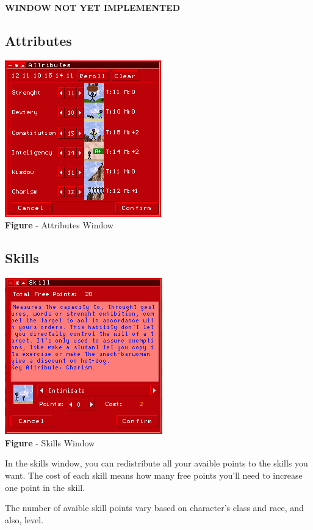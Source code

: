 \documentclass[ letterpaper,12pt]{article}
\begin{document}
{\bf WINDOW NOT YET IMPLEMENTED}

\subsection{Attributes}

\begin{center}
  \includegraphics{attWindow.png}
\\{\bf Figure} - Attributes Window
\end{center}


\subsection{Skills}

\begin{center}
  \includegraphics{skillWindow.png}
\\{\bf Figure} - Skills Window
\end{center}

In the skills window, you can redistribute all your avaible points to the skills you want. The cost of each skill means how many free points you'll need to increase one point in the skill.

The number of avaible skill points vary based on character's class and race, and also, level.
\end{document}
